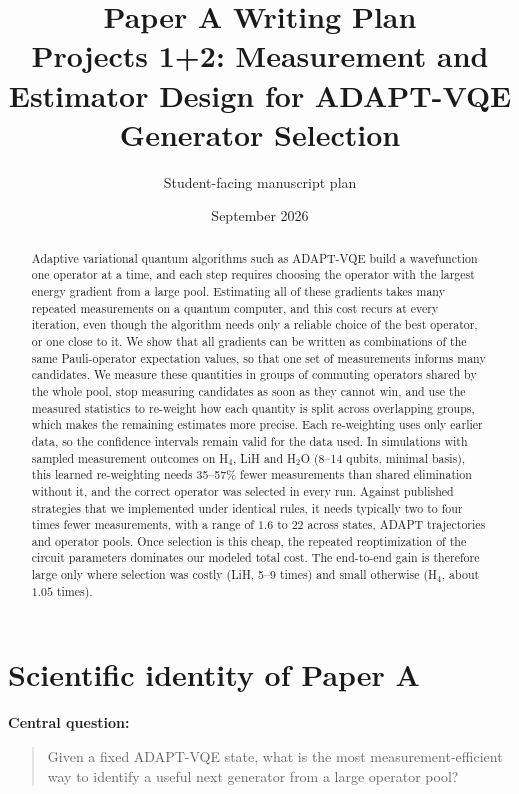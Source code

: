 \documentclass[aps,pra,reprint,superscriptaddress,nofootinbib]{revtex4-2}
\begin{document}
\title{Paper A Writing Plan\\Projects 1+2: Measurement and Estimator Design for ADAPT-VQE Generator Selection}
\author{Student-facing manuscript plan}
\date{September 2026}
\begin{abstract}
Adaptive variational quantum algorithms such as ADAPT-VQE build a wavefunction one operator at a time, and each step requires choosing the operator with the largest energy gradient from a large pool. Estimating all of these gradients takes many repeated measurements on a quantum computer, and this cost recurs at every iteration, even though the algorithm needs only a reliable choice of the best operator, or one close to it. We show that all gradients can be written as combinations of the same Pauli-operator expectation values, so that one set of measurements informs many candidates. We measure these quantities in groups of commuting operators shared by the whole pool, stop measuring candidates as soon as they cannot win, and use the measured statistics to re-weight how each quantity is split across overlapping groups, which makes the remaining estimates more precise. Each re-weighting uses only earlier data, so the confidence intervals remain valid for the data used. In simulations with sampled measurement outcomes on H$_4$, LiH and H$_2$O (8--14 qubits, minimal basis), this learned re-weighting needs 35--57\% fewer measurements than shared elimination without it, and the correct operator was selected in every run. Against published strategies that we implemented under identical rules, it needs typically two to four times fewer measurements, with a range of $1.6$ to $22$ across states, ADAPT trajectories and operator pools. Once selection is this cheap, the repeated reoptimization of the circuit parameters dominates our modeled total cost. The end-to-end gain is therefore large only where selection was costly (LiH, 5--9 times) and small otherwise (H$_4$, about $1.05$ times).
\end{abstract}
\maketitle

\section*{Scientific identity of Paper A}

\textbf{Central question:}
\begin{quote}
Given a fixed ADAPT-VQE state, what is the most measurement-efficient way to identify a useful next generator from a large operator pool?
\end{quote}
\end{document}
